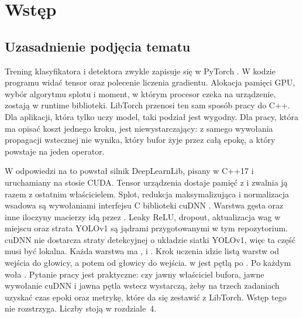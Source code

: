 \chapter{Wstęp}

\section{Uzasadnienie podjęcia tematu}

Trening klasyfikatora i detektora zwykle zapisuje się w PyTorch \cite{paszke2019pytorch}. W kodzie programu widać tensor oraz polecenie liczenia gradientu. Alokacja pamięci GPU, wybór algorytmu splotu i moment, w którym procesor czeka na urządzenie, zostają w runtime biblioteki. LibTorch przenosi ten sam sposób pracy do C++. Dla aplikacji, która tylko uczy model, taki podział jest wygodny. Dla pracy, która ma opisać koszt jednego kroku, jest niewystarczający: z samego wywołania propagacji wstecznej nie wynika, który bufor żyje przez całą epokę, a który powstaje na jeden operator.

W odpowiedzi na to powstał silnik DeepLearnLib, pisany w C++17 i uruchamiany na stosie CUDA. Tensor urządzenia dostaje pamięć z  i zwalnia ją razem z ostatnim właścicielem. Splot, redukcja maksymalizująca i normalizacja wsadowa są wywołaniami interfejsu C biblioteki cuDNN \cite{chetlur2014cudnn}. Warstwa gęsta oraz inne iloczyny macierzy idą przez . Leaky ReLU, dropout, aktualizacja wag w miejscu oraz strata YOLOv1 są jądrami przygotowanymi w tym repozytorium. cuDNN nie dostarcza straty detekcyjnej o układzie siatki YOLOv1, więc ta część musi być lokalna. Każda warstwa ma ,  i . Krok uczenia idzie listą warstw od wejścia do głowicy, a potem od głowicy do wejścia.  w  jest pętlą  po . Po każdym  woła . Pytanie pracy jest praktyczne: czy jawny właściciel bufora, jawne wywołanie cuDNN i jawna pętla wstecz wystarczą, żeby na trzech zadaniach uzyskać czas epoki oraz metrykę, które da się zestawić z LibTorch. Wstęp tego nie rozstrzyga. Liczby stoją w rozdziale~4.

